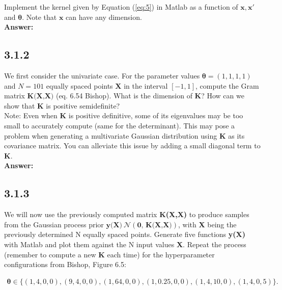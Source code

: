 \documentclass[a4paper]{article}
\begin{document}
Implement the kernel given by Equation (\ref{eq:5}) in Matlab as a function of $\textbf{x}, \textbf{x}'$ and $\boldsymbol{\theta}$. Note that $\textbf{x}$ can have any dimension.\\

\textbf{Answer:}\\





\subsection*{3.1.2}

We first consider the univariate case. For the parameter values $\boldsymbol{\theta} = (1,1,1,1)$ and $N = 101$ equally spaced points $\textbf{X}$ in the interval $[-1,1]$, compute the Gram matrix $\textbf{K(X,X)}$ (eq. 6.54 Bishop). What is the dimension of \textbf{K}? How can we show that \textbf{K} is positive semidefinite?\\

Note: Even when \textbf{K} is positive definitive, some of its eigenvalues may be too small to accurately compute (same for the determinant). This may pose a problem when generating a multivariate Gaussian distribution using \textbf{K} as its covariance matrix. You can alleviate this issue by adding a small diagonal term to \textbf{K}.\\


\textbf{Answer:}\\







\subsection*{3.1.3}

We will now use the previously computed matrix \textbf{K(X,X)} to produce samples from the Gaussian process prior $\textbf{y(X)} ~\mathcal{N}(\textbf{0, K(X,X)})$, with \textbf{X} being the previously determined N equally spaced points. Generate five functions \textbf{y(X)} with Matlab and plot them against the N input values \textbf{X}. Repeat the process (remember to compute a new \textbf{K} each time) for the hyperparameter configurations from Bishop, Figure 6.5:

\begin{align*}
\boldsymbol{\theta} \in \{(1,4,0,0),(9,4,0,0),(1,64,0,0),(1,0.25,0,0),(1,4,10,0),(1,4,0,5)\}.
\end{align*}
\end{document}
